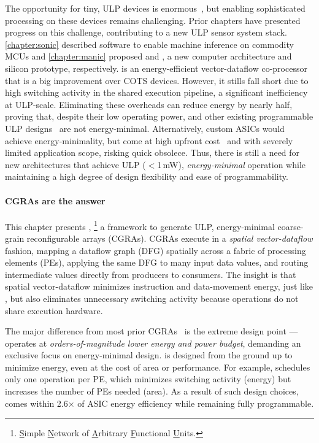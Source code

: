 The opportunity for tiny, ULP devices is enormous~\cite{lucia2017intermittent}, but enabling sophisticated processing on these devices remains challenging.
% 
Prior chapters have presented progress on this challenge, contributing to a new ULP sensor system stack.
% 
\autoref{chapter:sonic} described software to enable machine inference on commodity MCUs and \autoref{chapter:manic} proposed \manic and \msilicon, a new computer architecture and silicon prototype, respectively.
% 
\manic is an energy-efficient vector-dataflow co-processor that is a big improvement over COTS devices.
% 
However, it stills fall short due to high switching activity
in the shared execution pipeline, a significant inefficiency at ULP-scale.
% 
Eliminating these overheads can reduce energy by nearly half, proving that, despite their low operating power, \manic and other existing programmable ULP designs~\cite{dally:ieee08:elm,hempstead2005ultra,warneke200417,nazhandali2005energy} are not energy-minimal.
% 
Alternatively, custom ASICs would achieve energy-minimality, but come at high upfront cost~\cite{hotmobile2021} and with severely limited application scope, risking quick obsolece.
% 
Thus, there is still a need for new architectures that achieve ULP ($<$1\,mW), \emph{energy-minimal} operation while maintaining a high degree of design flexibility and ease of programmability.

\paragraph{\Ulp CGRAs are the answer}
%
This chapter presents \snafuframe,%
\footnote[2]{\underline{S}imple \underline{N}etwork of \underline{A}rbitrary \underline{F}unctional \underline{U}nits.}
a framework to generate ULP, energy-minimal coarse-grain reconfigurable arrays (CGRAs).
%
\snafuframe CGRAs execute in a \emph{spatial vector-dataflow} fashion,
mapping a dataflow graph (DFG) spatially across a fabric of processing elements (PEs),
applying the same DFG to many input data values,
and routing intermediate values directly from producers to consumers.
%
The insight is that spatial vector-dataflow minimizes instruction and data-movement energy, just like \manic,
but also eliminates unnecessary switching activity because operations do not share execution hardware.

The major difference from most prior CGRAs~\cite{plasticine,dyser,nowatzki:isca17:stream-dataflow,goldstein2000piperench,trips,weng2020dsagen,weng2020hybrid,voitsechov2014single,mishra2006tartan,tan2018stitch,karunaratne2017hycube,voitsechov2018inter,evx} is the extreme design point
--- \snafuframe operates at \emph{orders-of-magnitude lower energy and power budget},
demanding an exclusive focus on energy-minimal design.
%
\snafuframe is designed from the ground up to minimize energy, even at
the cost of area or performance.
%
For example, \snafuframe schedules only one operation per PE, which
minimizes switching activity (energy) but increases the number of PEs needed (area).
%
As a result of such design choices, \snafuframe comes within 2.6$\times$
of ASIC energy efficiency while remaining fully programmable.
%

